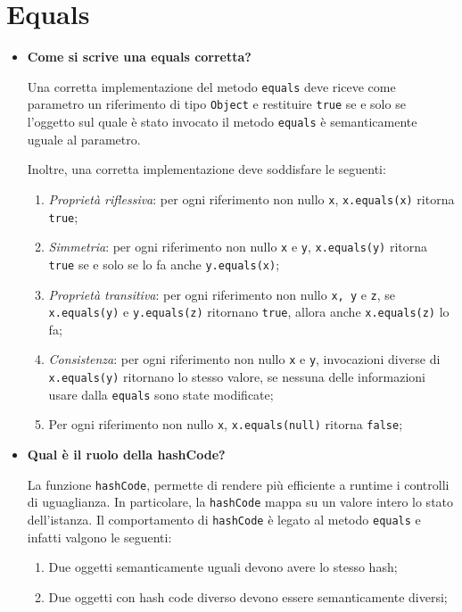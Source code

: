\documentclass[12pt, a4paper]{article}
\begin{document}
\section{Equals}
\begin{itemize}
    \item \textbf{Come si scrive una equals corretta?}
    
    Una corretta implementazione del metodo \texttt{equals} deve riceve come parametro un
    riferimento di tipo \texttt{Object} e restituire \texttt{true} se e solo se
    l'oggetto sul quale è stato invocato il metodo \texttt{equals} è semanticamente
    uguale al parametro.

    Inoltre, una corretta implementazione deve soddisfare le seguenti:
    \begin{enumerate}[label=(\roman*)]
        \item \emph{Proprietà riflessiva}: per ogni riferimento non nullo \texttt{x},
        \texttt{x.equals(x)} ritorna \texttt{true};
        \item \emph{Simmetria}: per ogni riferimento non nullo \texttt{x}
        e \texttt{y}, \texttt{x.equals(y)} ritorna \texttt{true} se e solo se lo fa
        anche \texttt{y.equals(x)};
        \item \emph{Proprietà transitiva}: per ogni riferimento non nullo \texttt{x, y}
        e \texttt{z}, se \texttt{x.equals(y)} e \texttt{y.equals(z)} ritornano
        \texttt{true}, allora anche \texttt{x.equals(z)} lo fa;
        \item \emph{Consistenza}: per ogni riferimento non nullo \texttt{x}
        e \texttt{y}, invocazioni diverse di \texttt{x.equals(y)} ritornano lo stesso
        valore, se nessuna delle informazioni usare dalla \texttt{equals} sono state
        modificate;
        \item Per ogni riferimento non nullo \texttt{x}, \texttt{x.equals(null)} ritorna
        \texttt{false}; 
    \end{enumerate}
    
    \item \textbf{Qual è il ruolo della hashCode?}
    
    La funzione \texttt{hashCode}, permette di rendere più efficiente a runtime i
    controlli di uguaglianza. In particolare, la \texttt{hashCode} mappa su un valore
    intero lo stato dell'istanza. Il comportamento di \texttt{hashCode} è legato al
    metodo \texttt{equals} e infatti valgono le seguenti:
    \begin{enumerate}[label=(\roman*)]
        \item Due oggetti semanticamente uguali devono avere lo stesso hash;
        \item Due oggetti con hash code diverso devono essere semanticamente diversi;
    \end{enumerate}


\end{itemize}
\end{document}
